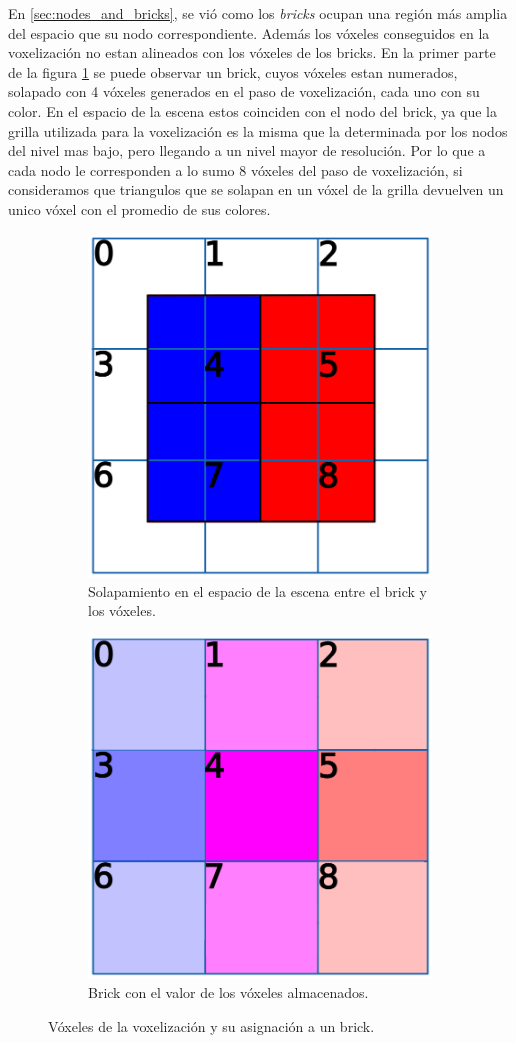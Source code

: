 En \ref{sec:nodes_and_bricks}, se vió como los \textit{bricks} ocupan una región más amplia del espacio que su nodo correspondiente.
Además los vóxeles conseguidos en la voxelización no estan alineados con los vóxeles de los bricks.
En la primer parte de la figura \ref{fig:voxels-to-bricks} se puede observar un brick, cuyos vóxeles estan numerados, solapado con 4 vóxeles generados en el paso de voxelización, cada uno con su color.
En el espacio de la escena estos coinciden con el nodo del brick, ya que la grilla utilizada para la voxelización es la misma que la determinada por los nodos del nivel mas bajo, pero llegando a un nivel mayor de resolución.
Por lo que a cada nodo le corresponden a lo sumo 8 vóxeles del paso de voxelización, si consideramos que triangulos que se solapan en un vóxel de la grilla devuelven un unico vóxel con el promedio de sus colores.

\begin{figure}[ht]
    \begin{subfigure}{.49\textwidth}
        \centering
        \includegraphics[width=.5\textwidth]{voxels-to-bricks.png}
        \caption{Solapamiento en el espacio de la escena entre el brick y los vóxeles.}
    \end{subfigure}
    \begin{subfigure}{.49\textwidth}
        \centering
        \includegraphics[width=.5\textwidth]{voxels-to-bricks-b.png}
        \caption{Brick con el valor de los vóxeles almacenados.}
    \end{subfigure}
    \caption{Vóxeles de la voxelización y su asignación a un brick.}
    \label{fig:voxels-to-bricks}
\end{figure}

